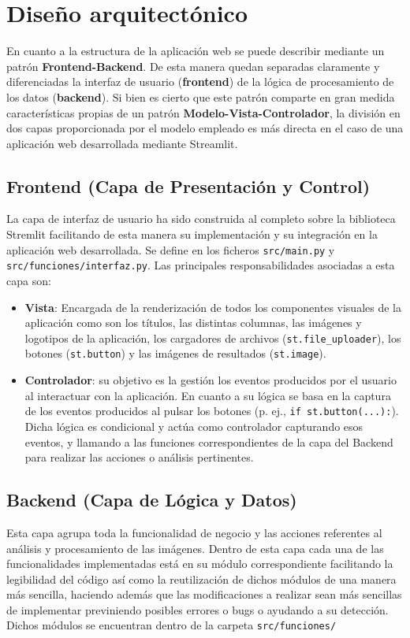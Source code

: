 \section{Diseño arquitectónico}
En cuanto a la estructura de la aplicación web se puede describir mediante un patrón \textbf{Frontend-Backend}. De esta manera quedan separadas claramente y diferenciadas la interfaz de usuario (\textbf{frontend}) de la lógica de procesamiento de los datos (\textbf{backend}). Si bien es cierto que este patrón comparte en gran medida características propias de un patrón \textbf{Modelo-Vista-Controlador}, la división en dos capas proporcionada por el modelo empleado es más directa en el caso de una aplicación web desarrollada mediante Streamlit.

\subsection{Frontend (Capa de Presentación y Control)}
La capa de interfaz de usuario ha sido construida al completo sobre la biblioteca Stremlit facilitando de esta manera su implementación y su integración en la aplicación web desarrollada. Se define en los ficheros \texttt{src/main.py} y \texttt{src/funciones/interfaz.py}. Las principales responsabilidades asociadas a esta capa son:
\begin{itemize}
    \item \textbf{Vista}: Encargada de la renderización de todos los componentes visuales de la aplicación como son los títulos, las distintas columnas, las imágenes y logotipos de la aplicación,  los cargadores de archivos (\verb|st.file_uploader|), los botones (\verb|st.button|) y las imágenes de resultados (\verb|st.image|).
    \item \textbf{Controlador}: su objetivo es la gestión los eventos producidos por el usuario al interactuar con la aplicación. En cuanto a su lógica se basa en la captura de los eventos producidos al pulsar los botones (p. ej., \verb|if st.button(...):|). Dicha lógica es condicional y actúa como controlador capturando esos eventos, y llamando a las funciones correspondientes de la capa del Backend para realizar las acciones o análisis pertinentes.

\end{itemize}

\subsection{Backend (Capa de Lógica y Datos)}
Esta capa agrupa toda la funcionalidad de negocio y las acciones referentes al análisis y procesamiento de las imágenes. Dentro de esta capa cada una de las funcionalidades implementadas está en su módulo correspondiente facilitando la legibilidad del código así como la reutilización de dichos módulos de una manera más sencilla, haciendo además que las modificaciones a realizar sean más sencillas de implementar previniendo posibles errores o bugs o ayudando a su detección. Dichos módulos se encuentran dentro de la carpeta \texttt{src/funciones/}

